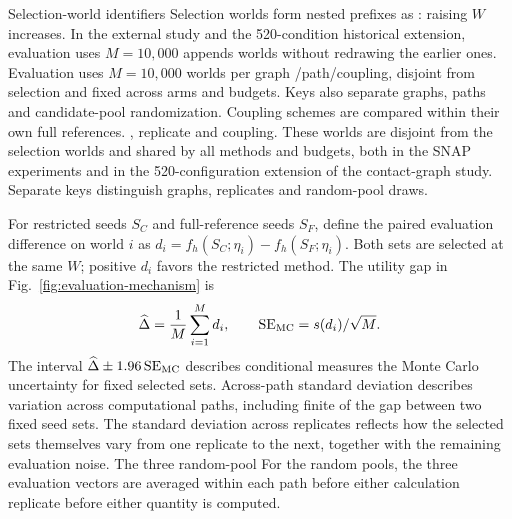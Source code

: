 \documentclass[smallextended]{svjour3}
\providecommand{\DIFaddtex}[1]{{\protect\color{blue} \sf #1}} %
\providecommand{\DIFdeltex}[1]{{\protect\color{red} \scriptsize #1}} %
\providecommand{\DIFaddbegin}{} %
\providecommand{\DIFaddend}{} %
\providecommand{\DIFdelbegin}{} %
\providecommand{\DIFdelend}{} %
\providecommand{\DIFadd}[1]{\texorpdfstring{\DIFaddtex{#1}}{#1}} %
\providecommand{\DIFdel}[1]{\texorpdfstring{\DIFdeltex{#1}}{}} %
\providecommand{\DIFscaledelfig}{0.5}
\newlength{\DIFdelgraphicswidth} %
\newlength{\DIFdelgraphicsheight} %
\providecommand{\DIFaddincludegraphics}[2][]{{\color{blue}\fbox{\DIFOincludegraphics[#1]{#2}}}} %
\providecommand{\DIFdelincludegraphics}[2][]{%
\sbox{\DIFdelgraphicsbox}{\DIFOincludegraphics[#1]{#2}}%
\settoboxwidth{\DIFdelgraphicswidth}{\DIFdelgraphicsbox} %
\settoboxtotalheight{\DIFdelgraphicsheight}{\DIFdelgraphicsbox} %
\scalebox{\DIFscaledelfig}{%
\parbox[b]{\DIFdelgraphicswidth}{\usebox{\DIFdelgraphicsbox}\\[-\baselineskip] \rule{\DIFdelgraphicswidth}{0em}}\llap{\resizebox{\DIFdelgraphicswidth}{\DIFdelgraphicsheight}{%
\setlength{\unitlength}{\DIFdelgraphicswidth}%
\begin{picture}(1,1)%
\thicklines\linethickness{2pt} %
{\color[rgb]{1,0,0}\put(0,0){\framebox(1,1){}}}%
{\color[rgb]{1,0,0}\put(0,0){\line( 1,1){1}}}%
{\color[rgb]{1,0,0}\put(0,1){\line(1,-1){1}}}%
\end{picture}%
}\hspace*{3pt}}} %
} %
\DeclareRobustCommand{\DIFaddbegin}{\DIFOaddbegin \let\includegraphics\DIFaddincludegraphics} %
\DeclareRobustCommand{\DIFaddend}{\DIFOaddend \let\includegraphics\DIFOincludegraphics} %
\DeclareRobustCommand{\DIFdelbegin}{\DIFOdelbegin \let\includegraphics\DIFdelincludegraphics} %
\DeclareRobustCommand{\DIFdelend}{\DIFOaddend \let\includegraphics\DIFOincludegraphics} %
\begin{document}
\DIFdelbegin \DIFdel{Selection-world identifiers }\DIFdelend \DIFaddbegin \DIFadd{Selection worlds }\DIFaddend form nested prefixes\DIFdelbegin \DIFdel{as }\DIFdelend \DIFaddbegin \DIFadd{: raising }\DIFaddend $W$ \DIFdelbegin \DIFdel{increases. In the external study and the 520-condition historical extension, evaluation uses $M=10,000$ }\DIFdelend \DIFaddbegin \DIFadd{appends worlds without redrawing the earlier ones. Evaluation uses $M=10{,}000$ }\DIFaddend worlds per graph\DIFdelbegin \DIFdel{/path/coupling, disjoint from selection and fixed across arms and budgets. Keys also separate graphs, paths and candidate-pool randomization.
Coupling schemes are compared within their own full references.
}\DIFdelend \DIFaddbegin \DIFadd{, replicate and coupling. These worlds are disjoint from the selection worlds and shared by all methods and budgets, both in the SNAP experiments and in the 520-configuration extension of the contact-graph study. Separate keys distinguish graphs, replicates and random-pool draws.
}\DIFaddend 

For restricted seeds $S_C$ and full-reference seeds $S_F$, define the paired evaluation difference on world $i$ as $d_i=f_h(S_C;\eta_i)-f_h(S_F;\eta_i)$. Both sets are selected at the same $W$; positive $d_i$ favors the restricted method. The utility gap in Fig.~\ref{fig:evaluation-mechanism} is
\begin{equation}
\widehat\Delta=\frac{1}{M}\sum_{i=1}^{M}d_i,
\qquad \operatorname{SE}_{\rm MC}=s(d_i)/\sqrt M.
\end{equation}
The interval $\widehat\Delta\pm1.96\operatorname{SE}_{\rm MC}$ \DIFdelbegin \DIFdel{describes conditional }\DIFdelend \DIFaddbegin \DIFadd{measures the }\DIFaddend Monte Carlo uncertainty \DIFdelbegin \DIFdel{for fixed selected sets. Across-path standard deviation describes variation across computational paths, including finite }\DIFdelend \DIFaddbegin \DIFadd{of the gap between two fixed seed sets. The standard deviation across replicates reflects how the selected sets themselves vary from one replicate to the next, together with the remaining }\DIFaddend evaluation noise. \DIFdelbegin \DIFdel{The three random-pool }\DIFdelend \DIFaddbegin \DIFadd{For the random pools, the three }\DIFaddend evaluation vectors are averaged within each \DIFdelbegin \DIFdel{path before either calculation}\DIFdelend \DIFaddbegin \DIFadd{replicate before either quantity is computed}\DIFaddend .
\end{document}

